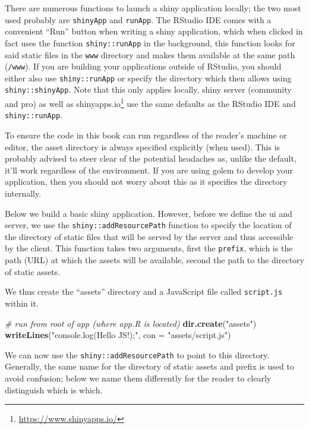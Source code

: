 \documentclass[
  10pt,
]{krantz}
\makeatletter
\newenvironment{Shaded}{\begin{snugshade}}{\end{snugshade}}
\newcommand{\CommentTok}[1]{\textcolor[rgb]{0.37,0.37,0.37}{\textit{#1}}}
\newcommand{\DataTypeTok}[1]{\textcolor[rgb]{0.27,0.27,0.27}{#1}}
\newcommand{\KeywordTok}[1]{\textcolor[rgb]{0.27,0.27,0.27}{\textbf{#1}}}
\newcommand{\NormalTok}[1]{#1}
\newcommand{\StringTok}[1]{\textcolor[rgb]{0.5,0.5,0.5}{#1}}
\renewcommand{\href}[2]{#2\footnote{\url{#1}}}
\newenvironment{kframe}{%
\medskip{}
\setlength{\fboxsep}{.8em}
 \def\at@end@of@kframe{}%
 \ifinner\ifhmode%
  \def\at@end@of@kframe{\end{minipage}}%
  \begin{minipage}{\columnwidth}%
 \fi\fi%
 \def\FrameCommand##1{\hskip\@totalleftmargin \hskip-\fboxsep
 \colorbox{shadecolor}{##1}\hskip-\fboxsep
     \hskip-\linewidth \hskip-\@totalleftmargin \hskip\columnwidth}%
 \MakeFramed {\advance\hsize-\width
   \@totalleftmargin\z@ \linewidth\hsize
   \@setminipage}}%
 {\par\unskip\endMakeFramed%
 \at@end@of@kframe}
\renewenvironment{Shaded}{\begin{kframe}}{\end{kframe}}
\makeatother
\begin{document}
There are numerous functions to launch a shiny application locally; the two most used probably are \texttt{shinyApp} and \texttt{runApp}. The RStudio IDE comes with a convenient ``Run'' button when writing a shiny application, which when clicked in fact uses the function \texttt{shiny::runApp} in the background, this function looks for said static files in the \texttt{www} directory and makes them available at the same path (\texttt{/www}). If you are building your applications outside of RStudio, you should either also use \texttt{shiny::runApp} or specify the directory which then allows using \texttt{shiny::shinyApp}. Note that this only applies locally, shiny server (community and pro) as well as \href{https://www.shinyapps.io/}{shinyapps.io} use the same defaults as the RStudio IDE and \texttt{shiny::runApp}.

To ensure the code in this book can run regardless of the reader's machine or editor, the asset directory is always specified explicitly (when used). This is probably advised to steer clear of the potential headaches as, unlike the default, it'll work regardless of the environment. If you are using golem \citep{R-golem} to develop your application, then you should not worry about this as it specifies the directory internally.

Below we build a basic shiny application. However, before we define the ui and server, we use the \texttt{shiny::addResourcePath} function to specify the location of the directory of static files that will be served by the server and thus accessible by the client. This function takes two arguments, first the \texttt{prefix}, which is the path (URL) at which the assets will be available, second the path to the directory of static assets.

We thus create the ``assets'' directory and a JavaScript file called \texttt{script.js} within it.

\begin{Shaded}
\begin{Highlighting}[]
\CommentTok{\# run from root of app (where app.R is located)}
\KeywordTok{dir.create}\NormalTok{(}\StringTok{"assets"}\NormalTok{)}
\KeywordTok{writeLines}\NormalTok{(}\StringTok{"console.log(\textquotesingle{}Hello JS!\textquotesingle{});"}\NormalTok{, }\DataTypeTok{con =} \StringTok{"assets/script.js"}\NormalTok{)}
\end{Highlighting}
\end{Shaded}

We can now use the \texttt{shiny::addResourcePath} to point to this directory. Generally, the same name for the directory of static assets and prefix is used to avoid confusion; below we name them differently for the reader to clearly distinguish which is which.
\end{document}
